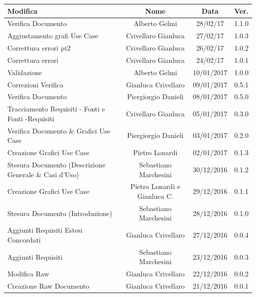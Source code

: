 \documentclass[12pt,a4paper,titlepage]{article}
\begin{document}
	{\renewcommand\arraystretch{1.2}  %
		\begin{tabular}{|l|c|c|c|}
			\hline
			{\textbf{Modifica}}&{\textbf{Nome}}&{\textbf{Data}}&{\textbf{Ver.}}\\
			\hline
			Verifica Documento & Alberto Gelmi & 28/02/17 & 1.1.0 \\
			\hline
			Aggiustamento grafi Use Case & Crivellaro Gianluca & 27/02/17 & 1.0.3 \\
			\hline
			Correttura errori pt2 & Crivellaro Gianluca & 26/02/17 & 1.0.2 \\
			\hline
			Correttura errori & Crivellaro Gianluca & 24/02/17 & 1.0.1 \\
			\hline
			Validazione & Alberto Gelmi & 10/01/2017 & 1.0.0 \\
			\hline
			Correzioni Verifica & Gianluca Crivellaro & 09/01/2017 & 0.5.1 \\
			\hline
			Verifica Documento & Piergiorgio Danieli & 08/01/2017 & 0.5.0 \\
			\hline
			Tracciamento Requisiti - Fonti e Fonti -Requisiti & Crivellaro Gianluca & 05/01/2017 & 0.3.0 \\
			\hline
			Verifica Documento \& Grafici Use Case & Piergiorgio Danieli & 03/01/2017 & 0.2.0 \\
			\hline
			Creazione Grafici Use Case & Pietro Lonardi & 02/01/2017 & 0.1.3 \\
			\hline
			Stesura Documento (Descrizione Generale \& Casi d'Uso) & Sebastiano Marchesini & 30/12/2016 & 0.1.2 \\	
			\hline
			Creazione Grafici Use Case & Pietro Lonardi e Gianluca C. & 29/12/2016 & 0.1.1 \\
			\hline
			Stesura Documento (Introduzione) & Sebastiano Marchesini &  28/12/2016 & 0.1.0 \\
			\hline
			Aggiunti Requisiti Estesi Concordati & Gianluca Crivellaro & 27/12/2016 & 0.0.4 \\
			\hline
			Aggiunti Requisiti & Sebastiano Marchesini & 23/12/2016 & 0.0.3 \\
			\hline
			Modifica Raw & Gianluca Crivellaro & 22/12/2016 & 0.0.2 \\
			\hline
			Creazione Raw Documento & Gianluca Crivellaro & 21/12/2016 & 0.0.1 \\
			\hline
		\end{tabular}
	}	\normalsize
	\newpage
	\tableofcontents
	\thispagestyle{empty}
	
	\newpage
		
\end{document}
